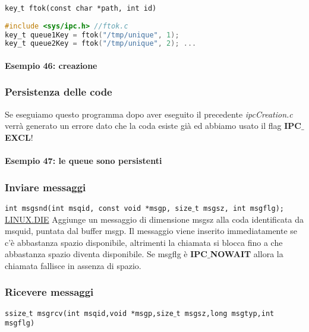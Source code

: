         \texttt{key$\_$t ftok(const char *path, int id)}
        
        \begin{lstlisting}[language=C]
#include <sys/ipc.h> //ftok.c
key_t queue1Key = ftok("/tmp/unique", 1);
key_t queue2Key = ftok("/tmp/unique", 2); ...
        \end{lstlisting}
        
            \paragraph{Esempio 46: creazione}\hfill \break

        \subsubsection{Persistenza delle code}
        Se eseguiamo questo programma dopo aver eseguito il precedente \textit{ipcCreation.c} verrà generato un errore dato che la coda esiste già ed abbiamo usato il flag \textbf{IPC$\_$EXCL}!
            \paragraph{Esempio 47: le queue sono persistenti}\hfill \break
        
        \subsubsection{Inviare messaggi}
        \texttt{int msgsnd(int msqid, const void *msgp, size$\_$t msgsz, int msgflg);}\\
        
        \href{https://linux.die.net/man/2/msgsnd}{LINUX.DIE} Aggiunge  un  messaggio  di  dimensione msgsz alla  coda  identificata  da msquid, puntata  dal  buffer msgp.  Il  messaggio  viene  inserito  immediatamente  se  c'è abbastanza spazio disponibile, altrimenti la chiamata si blocca fino a che abbastanza spazio diventa disponibile. Se msgflg è \textbf{IPC$\_$NOWAIT} allora la chiamata fallisce in assenza di spazio.
        
        \subsubsection{Ricevere messaggi}
        \texttt{ssize$\_$t msgrcv(int msqid,void *msgp,size$\_$t msgsz,long msgtyp,int msgflg)}\\


